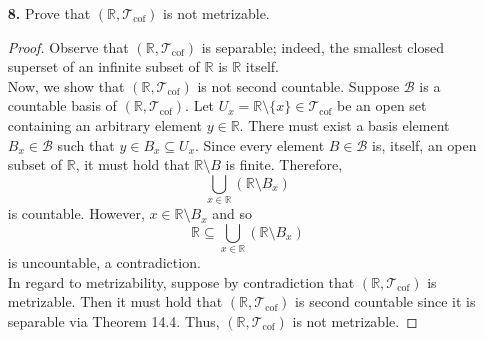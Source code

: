 \documentclass[ 12pt ]{article}
\begin{document}
\begin{enumerate}
\begin{proof}
			In regard to continuity, it is easy to see that both components of $\textbf{f}$ are continuous and so it must also be. Additionally, we can see that $\textbf{f}^{-1}$
			is continuous via analysis techniques and so $\mathbb{R} \cong S^1 \setminus \{ x \}$.
		\end{proof}


	\item[\textbf{8.}] Prove that $(\mathbb{R}, \mathcal{T}_\mathrm{cof})$ is not metrizable.

		\begin{proof}
			Observe that $(\mathbb{R}, \mathcal{T}_\mathrm{cof})$ is separable; indeed, the smallest closed superset of an infinite subset of $\mathbb{R}$ is $\mathbb{R}$ itself. \\

			Now, we show that $(\mathbb{R}, \mathcal{T}_\mathrm{cof})$ is not second countable. Suppose $\mathcal{B}$ is a countable basis of $(\mathbb{R}, \mathcal{T}_\mathrm{cof})$.
			Let $U_x = \mathbb{R} \setminus \{ x \} \in \mathcal{T}_\mathrm{cof}$ be an open set containing an arbitrary element $y \in \mathbb{R}$. There must exist a basis element
			$B_x \in \mathcal{B}$ such that $y \in B_x \subseteq U_x$. Since every element $B \in \mathcal{B}$ is, itself, an open subset of $\mathbb{R}$, it must hold that
			$\mathbb{R} \setminus B$ is finite. Therefore, $$\bigcup_{x \in \mathbb{R}} (\mathbb{R} \setminus B_x)$$ is countable. However, $x \in \mathbb{R} \setminus B_x$ and so
			$$\mathbb{R} \subseteq \bigcup_{x \in \mathbb{R}} (\mathbb{R} \setminus B_x)$$ is uncountable, a contradiction. \\

			In regard to metrizability, suppose by contradiction that $(\mathbb{R}, \mathcal{T}_\mathrm{cof})$ is metrizable. Then it must hold that $(\mathbb{R}, \mathcal{T}_\mathrm{cof})$
			is second countable since it is separable via Theorem 14.4. Thus, $(\mathbb{R}, \mathcal{T}_\mathrm{cof})$ is not metrizable.
		\end{proof}

\end{enumerate}
\end{document}
